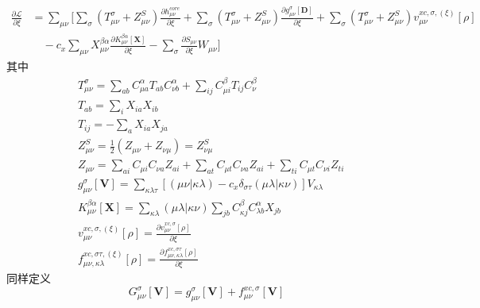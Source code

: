 \documentclass[11pt]{ctexart}
\numberwithin{equation}{section}
\begin{document}
\begin{equation}\label{eq:ROKS partial L}
    \begin{aligned}
        \frac{\partial\mathcal{L}}{\partial\xi} 
        &= \sum_{\mu\nu}\Bigg[
            \sum_{\sigma}(T_{\mu\nu}^{\sigma}+Z_{\mu\nu}^{S})\frac{\partial h_{\mu\nu}^{core}}{\partial\xi}
            + \sum_{\sigma}(T_{\mu\nu}^{\sigma}+Z_{\mu\nu}^{S})\frac{\partial g_{\mu\nu}^{\sigma}[\mathbf{D}]}{\partial\xi}
            +\sum_{\sigma}(T_{\mu\nu}^{\sigma}+Z_{\mu\nu}^{S})v_{\mu\nu}^{xc,\sigma,(\xi)}[\rho]\\
            &\quad - c_x\sum_{\mu\nu}X_{\mu\nu}^{\beta\alpha}\frac{\partial K_{\mu\nu}^{\beta\alpha}[\mathbf{X}]}{\partial\xi}
            - \sum_{\sigma}\frac{\partial S_{\mu\nu}}{\partial\xi} W_{\mu\nu}
        \Bigg]
    \end{aligned}
\end{equation}
其中
\begin{equation}
    \begin{aligned}
        & T_{\mu\nu}^{\sigma} 
        = \sum_{ab}C_{\mu a}^{\alpha}T_{ab}C_{\nu b}^{\alpha}
        + \sum_{ij}C_{\mu i}^{\beta}T_{ij}C_{\nu}^{\beta}\\
        & T_{ab} = \sum_{i}X_{ia}X_{ib}\\
        & T_{ij} = -\sum_{a}X_{ia}X_{ja}\\
        & Z_{\mu\nu}^{S} 
        = \frac{1}{2}(Z_{\mu\nu} + Z_{\nu\mu})
        = Z_{\nu\mu}^{S}\\
        & Z_{\mu\nu} 
        = \sum_{ai}C_{\mu i}C_{\nu a}Z_{ai}
        + \sum_{at}C_{\mu t}C_{\nu a}Z_{ai}
        + \sum_{ti}C_{\mu t}C_{\nu i}Z_{ti}\\
        & g_{\mu\nu}^{\sigma}[\mathbf{V}] = \sum_{\kappa\lambda\tau}[(\mu\nu|\kappa\lambda)-c_x\delta_{\sigma\tau}(\mu\lambda|\kappa\nu)]V_{\kappa\lambda}\\
        & K_{\mu\nu}^{\beta\alpha}[\mathbf{X}] = \sum_{\kappa\lambda}(\mu\lambda|\kappa\nu)\sum_{jb}C_{\kappa j}^{\beta}C_{\lambda b}^{\alpha}X_{jb}\\
        & v_{\mu\nu}^{xc,\sigma,(\xi)}[\rho] = \frac{\partial v_{\mu\nu}^{xc,\sigma}[\rho]}{\partial \xi}\\
        & f_{\mu\nu,\kappa\lambda}^{xc,\sigma\tau,(\xi)}[\rho] = \frac{\partial f_{\mu\nu,\kappa\lambda}^{xc,\sigma\tau}[\rho]}{\partial\xi}
    \end{aligned}
\end{equation}
同样定义
\begin{equation}
    G_{\mu\nu}^{\sigma}[\mathbf{V}] = g_{\mu\nu}^{\sigma}[\mathbf{V}] + f_{\mu\nu}^{xc,\sigma}[\mathbf{V}]
\end{equation}
\end{document}
